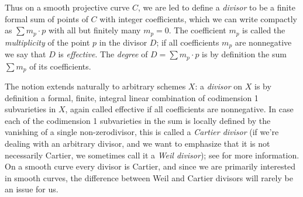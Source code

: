 Thus on a smooth projective curve $C$, we are led to define a \emph{divisor} to be a finite formal sum of points of $C$ with integer coefficients, which we can write compactly as $\sum m_p\cdot p$ with all but finitely many $m_p=0$.  The coefficient $m_p$ is called the \emph{multiplicity} of the point $p$ in the divisor $D$; if all coefficients $m_p$ are nonnegative we say that $D$ is \emph{effective}. The \emph{degree} of  $D = \sum m_p\cdot p$ is by definition the sum $\sum m_p$ of its coefficients. 

The notion extends naturally to arbitrary schemes $X$: a \emph{divisor} on $X$ is by definition a formal, finite, integral linear combination of codimension 1 subvarieties in $X$, again called effective if all coefficients are nonnegative. In case each of the codimension 1 subvarieties in the sum is locally defined by the vanishing of a single non-zerodivisor, this is called a \emph{Cartier divisor} (if we're dealing with an arbitrary divisor, and we want to emphasize that it is not necessarily Cartier, we sometimes call it a \emph{Weil divisor}); see \cite[pp. 140-146]{H} for more information.
On a smooth curve every divisor is Cartier, and since we are primarily interested in smooth curves, the difference between Weil and Cartier divisors will rarely be an issue for us.

%
%
%
%

